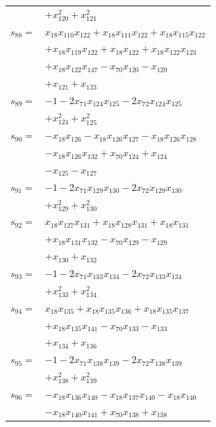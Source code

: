 \begin{longtable}{@{}r@{\;}l@{}}
 & \(\displaystyle +x_{120}^{2} +x_{121}^{2}\) \\[3pt]
\(s_{88}=\) & \(\displaystyle x_{18}x_{110}x_{122} +x_{18}x_{111}x_{122} +x_{18}x_{115}x_{122}\) \\
 & \(\displaystyle +x_{18}x_{119}x_{122} +x_{18}x_{122} +x_{18}x_{122}x_{123}\) \\
 & \(\displaystyle +x_{18}x_{122}x_{147} -x_{70}x_{120} -x_{120}\) \\
 & \(\displaystyle +x_{121} +x_{123}\) \\[3pt]
\(s_{89}=\) & \(\displaystyle -1 -2x_{71}x_{124}x_{125} -2x_{72}x_{124}x_{125}\) \\
 & \(\displaystyle +x_{124}^{2} +x_{125}^{2}\) \\[3pt]
\(s_{90}=\) & \(\displaystyle -x_{18}x_{126} -x_{18}x_{126}x_{127} -x_{18}x_{126}x_{128}\) \\
 & \(\displaystyle -x_{18}x_{126}x_{132} +x_{70}x_{124} +x_{124}\) \\
 & \(\displaystyle -x_{125} -x_{127}\) \\[3pt]
\(s_{91}=\) & \(\displaystyle -1 -2x_{71}x_{129}x_{130} -2x_{72}x_{129}x_{130}\) \\
 & \(\displaystyle +x_{129}^{2} +x_{130}^{2}\) \\[3pt]
\(s_{92}=\) & \(\displaystyle x_{18}x_{127}x_{131} +x_{18}x_{128}x_{131} +x_{18}x_{131}\) \\
 & \(\displaystyle +x_{18}x_{131}x_{132} -x_{70}x_{129} -x_{129}\) \\
 & \(\displaystyle +x_{130} +x_{132}\) \\[3pt]
\(s_{93}=\) & \(\displaystyle -1 -2x_{71}x_{133}x_{134} -2x_{72}x_{133}x_{134}\) \\
 & \(\displaystyle +x_{133}^{2} +x_{134}^{2}\) \\[3pt]
\(s_{94}=\) & \(\displaystyle x_{18}x_{135} +x_{18}x_{135}x_{136} +x_{18}x_{135}x_{137}\) \\
 & \(\displaystyle +x_{18}x_{135}x_{141} -x_{70}x_{133} -x_{133}\) \\
 & \(\displaystyle +x_{134} +x_{136}\) \\[3pt]
\(s_{95}=\) & \(\displaystyle -1 -2x_{71}x_{138}x_{139} -2x_{72}x_{138}x_{139}\) \\
 & \(\displaystyle +x_{138}^{2} +x_{139}^{2}\) \\[3pt]
\(s_{96}=\) & \(\displaystyle -x_{18}x_{136}x_{140} -x_{18}x_{137}x_{140} -x_{18}x_{140}\) \\
 & \(\displaystyle -x_{18}x_{140}x_{141} +x_{70}x_{138} +x_{138}\) \\

\end{longtable}
